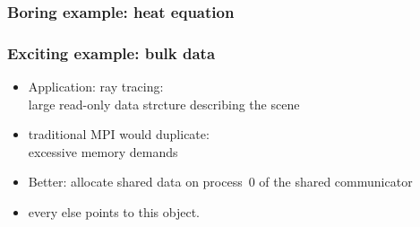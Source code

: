 \begin{frame}[containsverbatim]\frametitle{Boring example: heat equation}
\end{frame}

\begin{frame}[containsverbatim]\frametitle{Exciting example: bulk data}
  \begin{itemize}
  \item Application: ray tracing:\\
    large read-only data strcture describing the scene
  \item traditional MPI would duplicate:\\
    excessive memory demands
  \item Better: allocate shared data on process~0 of the shared communicator
  \item every else points to this object.
  \end{itemize}
\end{frame}

\begin{exerciseframe}[shareddata]
    
\end{exerciseframe}

\endinput

\begin{frame}[containsverbatim]\frametitle{}
\begin{lstlisting}
  
\end{lstlisting}
\end{frame}

